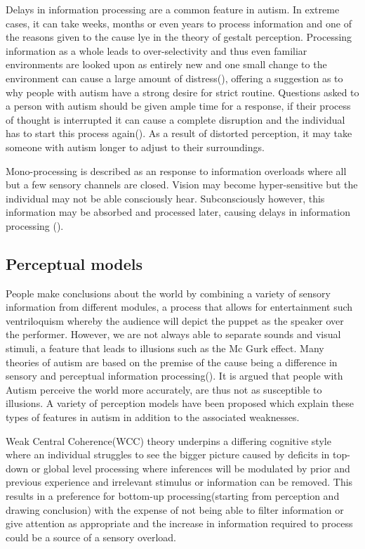 \documentclass[11pt]{report}
\begin{document}
Delays in information processing are a common feature in autism. In extreme cases, it can take weeks, months or even years to process information and one of the reasons given to the cause lye in the theory of gestalt perception. Processing information as a whole leads to over-selectivity and thus even familiar environments are looked upon as entirely new and one small change to the environment can cause a large amount of distress(\cite{olgab}), offering a suggestion as to why people with autism have a strong desire for strict routine. Questions asked to a person with autism should be given ample time for a response, if their process of thought is interrupted it can cause a complete disruption and the individual has to start this process again(\cite{olgab}). As a result of distorted perception, it may take someone with autism longer to adjust to their surroundings.

Mono-processing is described as an response to information overloads where all but a few sensory channels are closed. Vision may become hyper-sensitive but the individual may not be able consciously hear. Subconsciously however, this information may be absorbed and processed later, causing delays in information processing (\cite{olgab}).  

\subsection{Perceptual models}

People make conclusions about the world by combining a variety of sensory information from different modules, a process that allows for entertainment such ventriloquism whereby the audience will depict the puppet as the speaker over the performer. However, we are not always able to separate sounds and visual stimuli, a feature that leads to illusions such as the Mc Gurk effect. Many theories of autism are based on the premise of the cause being a difference in sensory and perceptual information processing(\cite{minshewmodel}). It is argued that people with Autism perceive the world more accurately, are thus not as susceptible to illusions. A variety of perception models have been proposed which explain these types of features in autism in addition to the associated weaknesses.  

Weak Central Coherence(WCC) theory underpins a differing cognitive style where an individual struggles to see the bigger picture caused by deficits in top-down or global level processing where inferences will be modulated by prior and previous experience and irrelevant stimulus or information can be removed. This results in a preference for bottom-up processing(starting from perception and drawing conclusion) with the expense of not being able to filter information or give attention as appropriate and the increase in information required to process could be a source of a sensory overload. 
\end{document}
